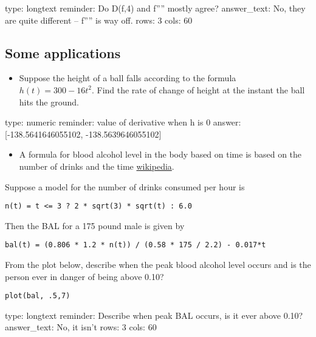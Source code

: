 \documentclass[12pt]{article}
\begin{document}
\begin{answer}
type: longtext
reminder: Do D(f,4) and f'''' mostly agree?
answer_text: No, they are quite different -- f'''' is way off. 
rows: 3
cols: 60
\end{answer}

\subsection{Some applications}

\begin{itemize}
\itemsep1pt\parskip0pt
\item
  Suppose the height of a ball falls according to the formula
  $h(t) =   300 - 16t^2$. Find the rate of change of height at the
  instant the ball hits the ground.
\end{itemize}

\begin{answer}
    type: numeric
    reminder: value of derivative when h is 0
    answer: [-138.5641646055102, -138.5639646055102]

\end{answer}

\begin{itemize}
\itemsep1pt\parskip0pt
\item
  A formula for blood alcohol level in the body based on time is based
  on the number of drinks and the time
  \href{http://en.wikipedia.org/wiki/Blood_alcohol_content}{wikipedia}.
\end{itemize}

Suppose a model for the number of drinks consumed per hour is



\begin{verbatim}
n(t) = t <= 3 ? 2 * sqrt(3) * sqrt(t) : 6.0
\end{verbatim}
Then the BAL for a 175 pound male is given by



\begin{verbatim}
bal(t) = (0.806 * 1.2 * n(t)) / (0.58 * 175 / 2.2) - 0.017*t
\end{verbatim}
From the plot below, describe when the peak blood alcohol level occurs
and is the person ever in danger of being above 0.10?



\begin{verbatim}
plot(bal, .5,7)
\end{verbatim}
\begin{answer}
type: longtext
reminder: Describe when peak BAL occurs, is it ever above 0.10?
answer_text: No, it isn't 
rows: 3
cols: 60
\end{answer}
\end{document}
